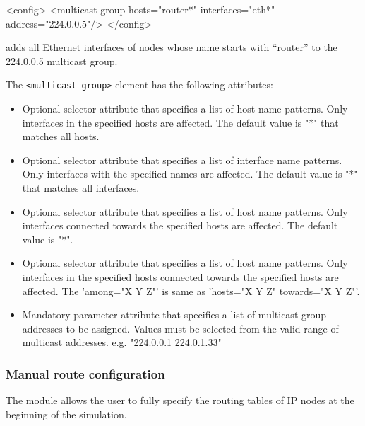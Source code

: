 \begin{XML}
<config>
  <multicast-group hosts="router*" interfaces="eth*" address="224.0.0.5"/>
</config>
\end{XML}

adds all Ethernet interfaces of nodes whose name starts with ``router''
to the 224.0.0.5 multicast group.

The \verb!<multicast-group>! element has the following attributes:
\begin{itemize}
    \item {}
      Optional selector attribute that specifies a list of host name patterns.
      Only interfaces in the specified hosts are affected. The default value
      is "*" that matches all hosts.
    \item {}
      Optional selector attribute that specifies a list of interface name
      patterns. Only interfaces with the specified names are affected. The
      default value is "*" that matches all interfaces.
    \item {}
      Optional selector attribute that specifies a list of host name patterns.
      Only interfaces connected towards the specified hosts are affected.
      The default value is "*".
    \item {}
      Optional selector attribute that specifies a list of host name patterns.
      Only interfaces in the specified hosts connected towards the specified
      hosts are affected.
      The 'among="X Y Z"' is same as 'hosts="X Y Z" towards="X Y Z"'.
    \item {}
      Mandatory parameter attribute that specifies a list of multicast group
      addresses to be assigned. Values must be selected from the valid range
      of multicast addresses.
      e.g. "224.0.0.1 224.0.1.33"
\end{itemize}


\subsubsection*{Manual route configuration}

The  module allows the user
to fully specify the routing tables of IP nodes at the beginning
of the simulation.

